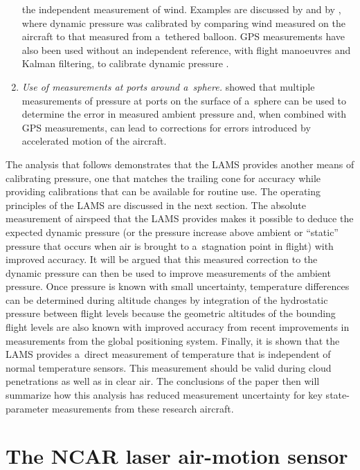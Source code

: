 \documentclass[amtd, online, hvmath]{copernicus}
\begin{document}
\begin{enumerate}
  the independent measurement of wind. Examples are discussed by
  \citet{FosterCunningham2010} and by \citet{MartosEtAl2011}, where
  dynamic pressure was calibrated by comparing wind measured on the
  aircraft to that measured from a~tethered balloon. GPS measurements
  have also been used without an independent reference, with flight
  manoeuvres and Kalman filtering, to calibrate dynamic pressure
  \citep{ISI:000286931800009}.
\item \textit{Use of measurements at ports around a~sphere.}
  \citet{RodiLeon2012} showed that multiple measurements of pressure
  at ports on the surface of a~sphere can be used to determine the
  error in measured ambient pressure and, when combined with GPS
  measurements, can lead to corrections for errors introduced by
  accelerated motion of the aircraft.
\end{enumerate}
The analysis that follows demonstrates that the LAMS provides another
means of calibrating pressure, one that matches the trailing cone for
accuracy while providing \mbox{calibrations} that can be available for
routine use. The operating principles of the LAMS are discussed in the
next section. The absolute measurement of airspeed that the LAMS
provides makes it possible to deduce the expected dynamic pressure (or
the pressure increase above ambient or ``static'' pressure that occurs
when air is brought to a~stagnation point in flight) with improved
accuracy. It will be argued that this measured correction to the
dynamic pressure can then be used to improve measurements of the
ambient pressure.  Once pressure is known with small uncertainty,
temperature differences can be determined during altitude changes by
integration of the hydrostatic pressure between flight levels because
the geometric altitudes of the bounding flight levels are also known
with improved accuracy from recent improvements in measurements from
the global positioning system.  Finally, it is shown that the LAMS
provides a~direct measurement of temperature that is independent of
normal temperature sensors. This measurement should be valid during
cloud penetrations as well as in clear air. The conclusions of the
paper then will summarize how this analysis has reduced measurement
uncertainty for key state-parameter measurements from these research
aircraft.

\section{The NCAR laser air-motion sensor}
\end{document}
